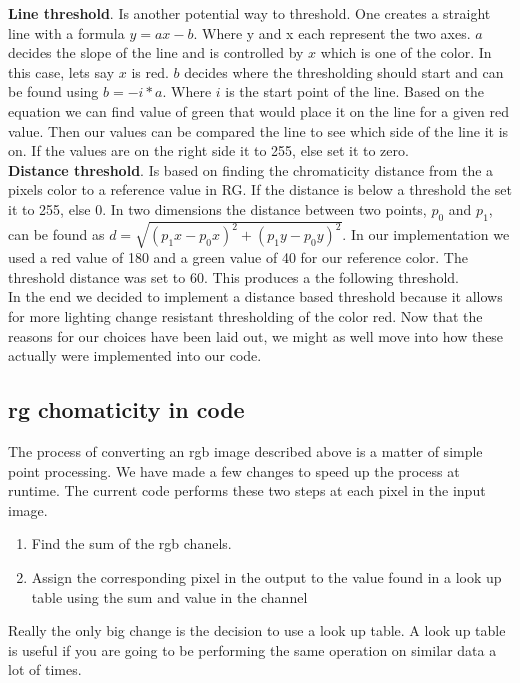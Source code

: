 \textbf{Line threshold}. Is another potential way to threshold. One creates a straight line with a formula $ y = ax - b$. Where y and x each represent the two axes. $a$ decides the slope of the line and is controlled by $x$ which is one of the color. In this case, lets say $x$ is red. $b$ decides where the thresholding should start and can be found using $b =- i * a$. Where $i$ is the start point of the line. Based on the equation we can find value of green that would place it on the line for a given red value. Then our values can be compared the line to see which side of the line it is on. If the values are on the right side it to 255, else set it to zero.\\

\textbf{Distance threshold}. Is based on finding the chromaticity distance from the a pixels color to a reference value in RG. If the distance is below a threshold the set it to 255, else 0. In two dimensions the distance between two points, $p_0$ and $p_1$, can be found as $d = \sqrt{(p_1x - p_0x)^2 +(p_1y - p_0y)^2}$. In our implementation we used a red value of 180 and a green value of 40 for our reference color. The threshold distance was set to 60. This produces a the following threshold.\\
In the end we decided to implement a distance based threshold because it allows for more lighting change resistant thresholding of the color red. Now that the reasons for our choices have been laid out, we might as well move into how these actually were implemented into our code.
\subsection{rg chomaticity in code}
The process of converting an rgb image described above is a matter of simple point processing. We have made a few changes to speed up the process at runtime. The current code performs these two steps at each pixel in the input image.\\
\begin{enumerate}
	\item Find the sum of the rgb chanels.
	\item Assign the corresponding pixel in the output to the value found in a look up table using the sum and value in the channel\\
\end{enumerate}
Really the only big change is the decision to use a look up table. A look up table is useful if you are going to be performing the same operation on similar data a lot of times. 
